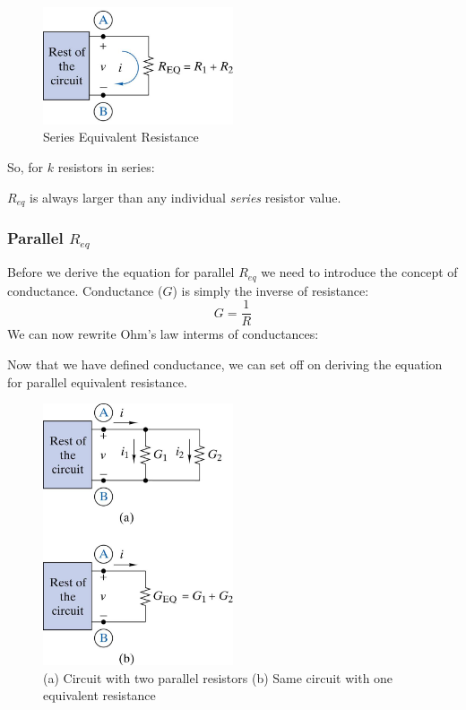 \documentclass{handout}
\begin{document}
\begin{figure}[h t b]
\centering
\includegraphics[width=0.5\textwidth]{SeriesReq.jpg}
\caption{Series Equivalent Resistance}
\label{fig: SeriesReq}
\end{figure}

So, for $k$ resistors in series:


$R_{eq}$ is always larger than any individual {\em series} resistor value.

\subsubsection{Parallel $R_{eq}$}
Before we derive the equation for parallel $R_{eq}$ we need to introduce the concept of conductance.  Conductance ($G$) is simply the inverse of resistance:
\begin{equation}
G=\frac{1}{R}
\end{equation}
We can now rewrite Ohm's law interms of conductances:

Now that we have defined conductance, we can set off on deriving the equation for parallel equivalent resistance.

\begin{figure}[h t b]
\centering
\includegraphics[width=0.5\textwidth]{ParallelReq.jpg}
\caption{(a) Circuit with two parallel resistors (b) Same circuit with one equivalent resistance}
\label{fig: ParallelReq}
\end{figure}
\end{document}
